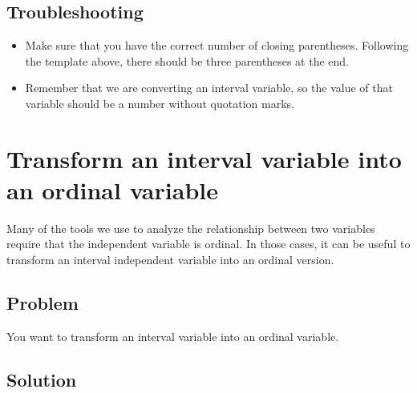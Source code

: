 \documentclass[
]{book}
\providecommand{\tightlist}{%
  \setlength{\itemsep}{0pt}\setlength{\parskip}{0pt}}
\begin{document}
\hypertarget{troubleshooting-20}{%
\subsection{Troubleshooting}\label{troubleshooting-20}}

\begin{itemize}
\tightlist
\item
  Make sure that you have the correct number of closing parentheses. Following the template above, there should be three parentheses at the end.
\item
  Remember that we are converting an interval variable, so the value of that variable should be a number without quotation marks.
\end{itemize}

\hypertarget{transform_ord}{%
\section{Transform an interval variable into an ordinal variable}\label{transform_ord}}

Many of the tools we use to analyze the relationship between two variables require that the independent variable is ordinal. In those cases, it can be useful to transform an interval independent variable into an ordinal version.

\hypertarget{problem-24}{%
\subsection{Problem}\label{problem-24}}

You want to transform an interval variable into an ordinal variable.

\hypertarget{solution-23}{%
\subsection{Solution}\label{solution-23}}
\end{document}
